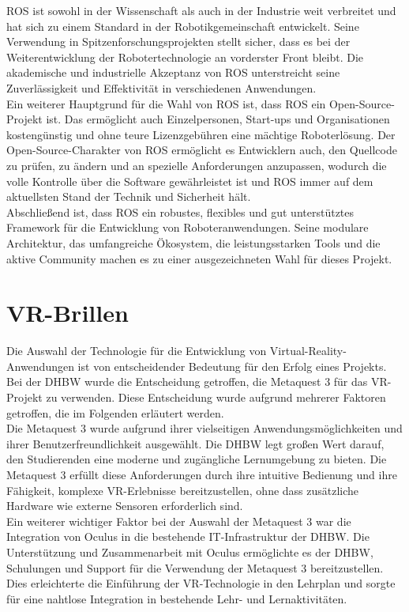 \ac{ROS} ist sowohl in der Wissenschaft als auch in der Industrie weit verbreitet und hat sich zu einem Standard in der Robotikgemeinschaft entwickelt. Seine Verwendung in Spitzenforschungsprojekten stellt sicher, dass es bei der Weiterentwicklung der Robotertechnologie an vorderster Front bleibt. Die akademische und industrielle Akzeptanz von ROS unterstreicht seine Zuverlässigkeit und Effektivität in verschiedenen Anwendungen.\\
Ein weiterer Hauptgrund für die Wahl von \ac{ROS} ist, dass \ac{ROS} ein Open-Source-Projekt ist. Das ermöglicht auch Einzelpersonen, Start-ups und Organisationen kostengünstig und ohne teure Lizenzgebühren eine mächtige Roboterlösung. Der Open-Source-Charakter von \ac{ROS} ermöglicht es Entwicklern auch, den Quellcode zu prüfen, zu ändern und an spezielle Anforderungen anzupassen, wodurch die volle Kontrolle über die Software gewährleistet ist und \ac{ROS} immer auf dem aktuellsten Stand der Technik und Sicherheit hält.\\
Abschließend ist, dass \ac{ROS} ein robustes, flexibles und gut unterstütztes Framework für die Entwicklung von Roboteranwendungen. Seine modulare Architektur, das umfangreiche Ökosystem, die leistungsstarken Tools und die aktive Community machen es zu einer ausgezeichneten Wahl für dieses Projekt.\\




\section{VR-Brillen}
Die Auswahl der Technologie für die Entwicklung von Virtual-Reality-Anwendungen ist von entscheidender Bedeutung für den Erfolg eines Projekts. Bei der DHBW wurde die Entscheidung getroffen, die Metaquest 3 für das VR-Projekt zu verwenden. Diese Entscheidung wurde aufgrund mehrerer Faktoren getroffen, die im Folgenden erläutert werden.
\\

\noindent
Die Metaquest 3 wurde aufgrund ihrer vielseitigen Anwendungsmöglichkeiten und ihrer Benutzerfreundlichkeit ausgewählt. Die DHBW legt großen Wert darauf, den Studierenden eine moderne und zugängliche Lernumgebung zu bieten. Die Metaquest 3 erfüllt diese Anforderungen durch ihre intuitive Bedienung und ihre Fähigkeit, komplexe VR-Erlebnisse bereitzustellen, ohne dass zusätzliche Hardware wie externe Sensoren erforderlich sind.
\\

\noindent
Ein weiterer wichtiger Faktor bei der Auswahl der Metaquest 3 war die Integration von Oculus in die bestehende IT-Infrastruktur der DHBW. Die Unterstützung und Zusammenarbeit mit Oculus ermöglichte es der DHBW, Schulungen und Support für die Verwendung der Metaquest 3 bereitzustellen. Dies erleichterte die Einführung der VR-Technologie in den Lehrplan und sorgte für eine nahtlose Integration in bestehende Lehr- und Lernaktivitäten.
\\

